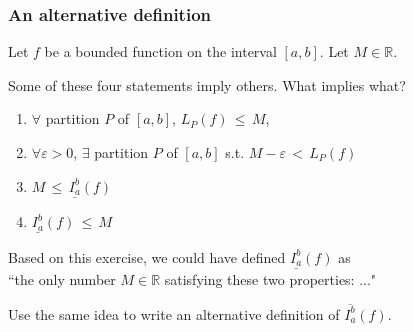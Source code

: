 \documentclass[14pt]{beamer}
\begin{document}
\begin{frame}[t]
	\fontsize{13}{13}\selectfont
	\frametitle{An alternative definition}

	Let $f$ be a bounded function on the interval $[a,b]$. Let $M \in \mathbb{R}$.

	Some of these four statements imply others. What implies what?
	\vspace{.2cm}
	\begin{enumerate}
		\item $\forall$ partition $P$ of $[a,b]$, \;
			$\displaystyle L_{P}(f) \,\leq\, M$,
			\vspace{.2cm}

		\item $\forall \varepsilon>0$, $\exists$ partition $P$ of $[a,b]$ \; s.t. \;
			$\displaystyle M - \varepsilon \,< \, L_{P}(f)$
			\vspace{.2cm}

		\item $\displaystyle M \, \leq \, \underline{I_a^b}(f)$

		\item $\displaystyle \underline{I_a^b}(f) \, \leq \, M$
	\end{enumerate}

	\vfill

	Based on this exercise, we could have defined $\underline{I_a^b}(f)$ as \\``the
	only number $M \in \mathbb{R}$ satisfying these two properties: ..."

	Use the same idea to write an alternative definition of $\overline{I_a^b}(f)$.

	\vfill
\end{frame}
\end{document}
